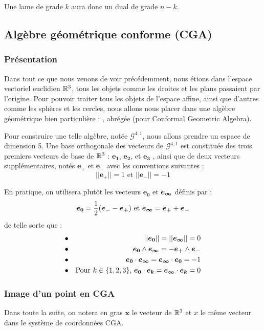 Une lame de grade $k$ aura donc un dual de grade $n-k$. 

\subsection{Algèbre géométrique conforme (CGA)}

\subsubsection{Présentation}
Dans tout ce que nous venons de voir précédemment, nous étions dans l'espace vectoriel euclidien $\mathbb{R}^3$, tous les objets comme les droites et les plans passaient par l'origine. Pour pouvoir traiter tous les objets de l'espace affine, ainsi que d'autres comme les sphères et les cercles, nous allons nous placer dans une algèbre géométrique bien particulière : , abrégée  (pour Conformal Geometric Algebra).

Pour construire une telle algèbre, notée $\mathscr{G}^{4,1}$, nous allons prendre un espace de dimension 5. Une base orthogonale des vecteurs de $\mathscr{G}^{4,1}$ est constituée des trois premiers vecteurs de base de $\mathbb{R}^3$ : $\bm{e_1}$, $\bm{e_2} $, et $\bm{e_3}$ , ainsi que de deux vecteurs supplémentaires, notés $\bm{e_+}$ et $\bm{e_-}$ avec les conventions suivantes : 
$$||\bm{e_+}|| = 1 \text{ et } ||\bm{e_-}|| = -1$$ 

En pratique, on utilisera plutôt les vecteurs $\bm{e_0}$ et $\bm{e_{\infty}}$ définis par : 
$$ \bm{e_0} = \frac{1}{2} (\bm{e_-} - \bm{e_+}) \text{ et }  \bm{e_{\infty}} = \bm{e_+}+ \bm{e_-}$$
de telle sorte que : 
\begin{eqnarray}
&\bullet & ||\bm{e_{0}}||=||\bm{e_{\infty}}|| = 0 \label{normeezei}\\
&\bullet &\bm{e_{0}} \wedge \bm{e_{\infty}} = -\bm{e_{+}} \wedge \bm{e_{-}}\\
&\bullet &\bm{e_{0}} \cdot \bm{e_{\infty}} = \bm{e_{\infty}} \cdot \bm{e_{0}} = -1 \label{ezei}\\
&\bullet &\text{Pour } k\in \lbrace1,2,3\rbrace \text{, }\bm{e_{0}} \cdot \bm{e_{k}} = \bm{e_{\infty}} \cdot \bm{e_{k}} = 0 \label{psbase}
\end{eqnarray}

\subsubsection{Image d'un point en CGA}

Dans toute la suite, on notera en gras $\bm{x}$ le vecteur de $\mathbb{R}^3$ et $x$ le même vecteur dans le système de coordonnées CGA.

